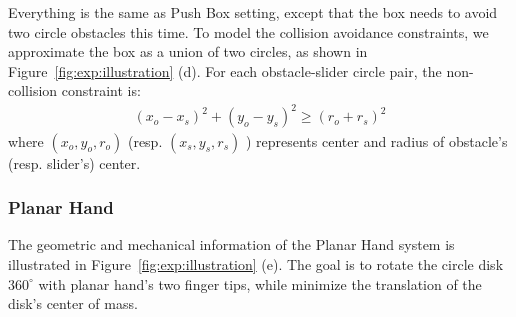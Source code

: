 Everything is the same as Push Box setting, except that the box needs to avoid two circle obstacles this time. To model the collision avoidance constraints, we approximate the box as a union of two circles, as shown in Figure~\ref{fig:exp:illustration} (d). For each obstacle-slider circle pair, the non-collision constraint is:
\begin{align}
    (x_o - x_s)^2 + (y_o - y_s)^2 \ge (r_o + r_s)^2
\end{align}
where $(x_o, y_o, r_o)$ (resp. $(x_s, y_s, r_s)$ ) represents center and radius of obstacle's (resp. slider's) center.

% 

\subsubsection{Planar Hand}
\label{app:pd:planar-hand}

The geometric and mechanical information of the Planar Hand system is illustrated in Figure~\ref{fig:exp:illustration} (e). The goal is to rotate the circle disk $360^\circ$ with planar hand's two finger tips, while minimize the translation of the disk's center of mass. 

